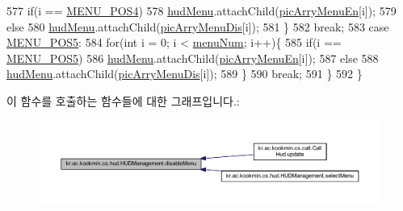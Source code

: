 \begin{DoxyCode}
577           \textcolor{keywordflow}{if}(i == \hyperlink{classkr_1_1ac_1_1kookmin_1_1cs_1_1hud_1_1_h_u_d_management_a6cae012a8c111a62d031ec590afe56bb}{MENU\_POS4})
578             \hyperlink{classkr_1_1ac_1_1kookmin_1_1cs_1_1hud_1_1_h_u_d_management_a42b564e79a47075337594ae2a83f4309}{hudMenu}.attachChild(\hyperlink{classkr_1_1ac_1_1kookmin_1_1cs_1_1hud_1_1_h_u_d_management_accf7a9ec5092e5872460755f3b81d6d5}{picArryMenuEn}[i]);
579           \textcolor{keywordflow}{else}
580             \hyperlink{classkr_1_1ac_1_1kookmin_1_1cs_1_1hud_1_1_h_u_d_management_a42b564e79a47075337594ae2a83f4309}{hudMenu}.attachChild(\hyperlink{classkr_1_1ac_1_1kookmin_1_1cs_1_1hud_1_1_h_u_d_management_ab5d064aafc8e948ecd818cfec7acbb3c}{picArryMenuDis}[i]);
581         \}
582         \textcolor{keywordflow}{break};
583       \textcolor{keywordflow}{case} \hyperlink{classkr_1_1ac_1_1kookmin_1_1cs_1_1hud_1_1_h_u_d_management_abfc1e4fd6ea23ecf49abfb86d47af051}{MENU\_POS5}:
584         \textcolor{keywordflow}{for}(\textcolor{keywordtype}{int} i = 0; i < \hyperlink{classkr_1_1ac_1_1kookmin_1_1cs_1_1hud_1_1_h_u_d_management_af69baaadf8bdb8b4f429269357fb84d9}{menuNum}; i++)\{
585           \textcolor{keywordflow}{if}(i == \hyperlink{classkr_1_1ac_1_1kookmin_1_1cs_1_1hud_1_1_h_u_d_management_abfc1e4fd6ea23ecf49abfb86d47af051}{MENU\_POS5})
586             \hyperlink{classkr_1_1ac_1_1kookmin_1_1cs_1_1hud_1_1_h_u_d_management_a42b564e79a47075337594ae2a83f4309}{hudMenu}.attachChild(\hyperlink{classkr_1_1ac_1_1kookmin_1_1cs_1_1hud_1_1_h_u_d_management_accf7a9ec5092e5872460755f3b81d6d5}{picArryMenuEn}[i]);
587           \textcolor{keywordflow}{else}
588             \hyperlink{classkr_1_1ac_1_1kookmin_1_1cs_1_1hud_1_1_h_u_d_management_a42b564e79a47075337594ae2a83f4309}{hudMenu}.attachChild(\hyperlink{classkr_1_1ac_1_1kookmin_1_1cs_1_1hud_1_1_h_u_d_management_ab5d064aafc8e948ecd818cfec7acbb3c}{picArryMenuDis}[i]);
589         \}
590         \textcolor{keywordflow}{break};
591     \}
592   \}
\end{DoxyCode}


이 함수를 호출하는 함수들에 대한 그래프입니다.\+:\nopagebreak
\begin{figure}[H]
\begin{center}
\leavevmode
\includegraphics[width=350pt]{classkr_1_1ac_1_1kookmin_1_1cs_1_1hud_1_1_h_u_d_management_a88d77a9d61e931e5b8460e7bfaa9558f_icgraph}
\end{center}
\end{figure}


